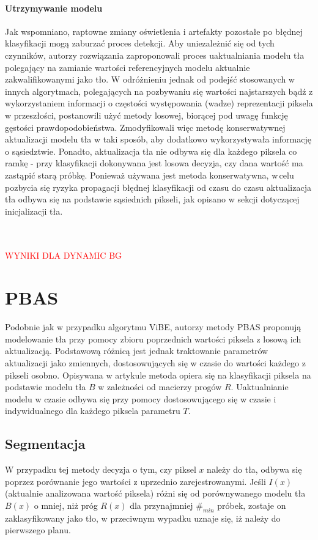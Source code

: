 \paragraph{Utrzymywanie modelu \\}
Jak wspomniano, raptowne zmiany oświetlenia i artefakty pozostałe po błędnej klasyfikacji mogą zaburzać proces detekcji. Aby uniezależnić się od tych czynników, autorzy rozwiązania zaproponowali proces uaktualniania modelu tła polegający na zamianie wartości referencyjnych modelu aktualnie zakwalifikowanymi jako tło. W odróżnieniu jednak od podejść stosowanych w innych algorytmach, polegających na pozbywaniu się wartości najstarszych bądź z wykorzystaniem informacji o częstości występowania (wadze) reprezentacji piksela w przeszłości, postanowili użyć metody losowej, biorącej pod uwagę funkcję gęstości prawdopodobieństwa. Zmodyfikowali więc metodę konserwatywnej aktualizacji modelu tła w taki sposób, aby dodatkowo wykorzystywała informację o sąsiedztwie. Ponadto, aktualizacja tła nie odbywa się dla każdego piksela co ramkę - przy klasyfikacji dokonywana jest losowa decyzja, czy dana wartość ma zastąpić starą próbkę. Ponieważ używana jest metoda konserwatywna, w\,celu pozbycia się ryzyka propagacji błędnej klasyfikacji od czasu do czasu aktualizacja tła odbywa się na podstawie sąsiednich pikseli, jak opisano w sekcji dotyczącej inicjalizacji tła.\\ \\ \\
\begin{LARGE}
\textcolor{red}{WYNIKI DLA DYNAMIC BG}
\end{LARGE}
\section{PBAS}
Podobnie jak w przypadku algorytmu ViBE, autorzy metody PBAS proponują modelowanie tła przy pomocy zbioru poprzednich wartości piksela z losową ich aktualizacją. Podstawową różnicą jest jednak traktowanie parametrów aktualizacji jako zmiennych, dostosowujących się w czasie do wartości każdego z pikseli osobno. Opisywana w artykule \cite{hofmann2012background} metoda opiera się na klasyfikacji piksela na podstawie modelu tła $B$ w zależności od macierzy progów $R$. Uaktualnianie modelu w czasie odbywa się przy pomocy dostosowującego się w czasie i indywidualnego dla każdego piksela parametru $T$.
\subsection{Segmentacja}
W przypadku tej metody decyzja o tym, czy piksel $x$ należy do tła, odbywa się poprzez porównanie jego wartości z uprzednio zarejestrowanymi. Jeśli $I(x)$ (aktualnie analizowana wartość piksela) różni się od porównywanego modelu tła $B(x)$ o mniej, niż próg $R(x)$ dla przynajmniej $\#_{min}$ próbek, zostaje on zaklasyfikowany jako tło, w przeciwnym wypadku uznaje się, iż należy do pierwszego planu.
